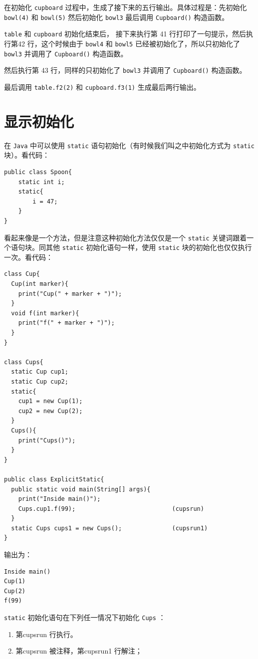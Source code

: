 \documentclass[10pt,a4paper,UTF8]{article}
\begin{document}
在初始化 \texttt{cupboard} 过程中，生成了接下来的五行输出。具体过程是：先初始化 \texttt{bowl(4)} 和 \texttt{bowl(5)} 然后初始化 \texttt{bowl3} 最后调用 \texttt{Cupboard()} 构造函数。

\texttt{table} 和 \texttt{cupboard} 初始化结束后， 接下来执行第 41 行打印了一句提示，然后执行第42 行，这个时候由于 \texttt{bowl4} 和 \texttt{bowl5} 已经被初始化了，所以只初始化了 \texttt{bowl3} 并调用了 \texttt{Cupboard()} 构造函数。

然后执行第 43 行，同样的只初始化了 \texttt{bowl3} 并调用了 \texttt{Cupboard()} 构造函数。

最后调用 \texttt{table.f2(2)} 和 \texttt{cupboard.f3(1)} 生成最后两行输出。
\section{显示初始化}
\label{sec:org4667218}


在 \texttt{Java} 中可以使用 \texttt{static} 语句初始化（有时候我们叫之中初始化方式为 \texttt{static} 块）。看代码：
\lstset{language=java,label= ,caption= ,captionpos=b,firstnumber=1,numbers=left}
\begin{lstlisting}
public class Spoon{
    static int i;
    static{
        i = 47;
    }
}
\end{lstlisting}
看起来像是一个方法，但是注意这种初始化方法仅仅是一个 \texttt{static} 关键词跟着一个语句块。同其他 \texttt{static} 初始化语句一样，使用 \texttt{static} 块的初始化也仅仅执行一次。看代码：
\lstset{language=C++,label= ,caption= ,captionpos=b,firstnumber=1,numbers=left}
\begin{lstlisting}
class Cup{
  Cup(int marker){
    print("Cup(" + marker + ")");
  }
  void f(int marker){
    print("f(" + marker + ")");
  }
}

class Cups{
  static Cup cup1;
  static Cup cup2;
  static{
    cup1 = new Cup(1);
    cup2 = new Cup(2);
  }
  Cups(){
    print("Cups()"); 
  }
}

public class ExplicitStatic{
  public static void main(String[] args){
    print("Inside main()");
    Cups.cup1.f(99);                           (cupsrun)
  }
  static Cups cups1 = new Cups();              (cupsrun1)
}
\end{lstlisting}

输出为：
\begin{verbatim}
Inside main()
Cup(1)
Cup(2)
f(99)
\end{verbatim}

\texttt{static} 初始化语句在下列任一情况下初始化 \texttt{Cups} ：
\begin{enumerate}
\item 第cupsrun 行执行。
\item 第cupsrun 被注释，第cupsrun1 行解注；
\end{enumerate}
\end{document}
